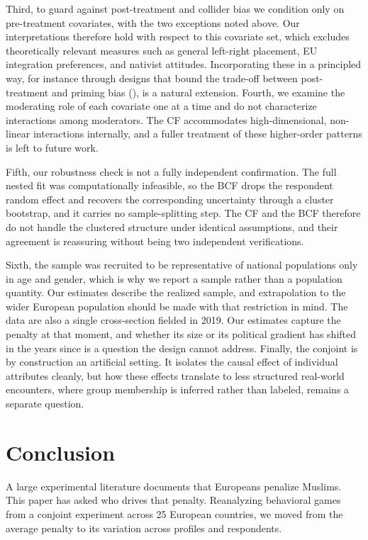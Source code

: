 \documentclass[
  10pt,
  a4paper,
  DIV=11,
  numbers=noendperiod]{scrartcl}
\begin{document}
Third, to guard against post-treatment and collider bias we condition
only on pre-treatment covariates, with the two exceptions noted above.
Our interpretations therefore hold with respect to this covariate set,
which excludes theoretically relevant measures such as general
left-right placement, EU integration preferences, and nativist
attitudes. Incorporating these in a principled way, for instance through
designs that bound the trade-off between post-treatment and priming bias
(), is a
natural extension. Fourth, we examine the moderating role of each
covariate one at a time and do not characterize interactions among
moderators. The CF accommodates high-dimensional, non-linear
interactions internally, and a fuller treatment of these higher-order
patterns is left to future work.

Fifth, our robustness check is not a fully independent confirmation. The
full nested fit was computationally infeasible, so the BCF drops the
respondent random effect and recovers the corresponding uncertainty
through a cluster bootstrap, and it carries no sample-splitting step.
The CF and the BCF therefore do not handle the clustered structure under
identical assumptions, and their agreement is reassuring without being
two independent verifications.

Sixth, the sample was recruited to be representative of national
populations only in age and gender, which is why we report a sample
rather than a population quantity. Our estimates describe the realized
sample, and extrapolation to the wider European population should be
made with that restriction in mind. The data are also a single
cross-section fielded in 2019. Our estimates capture the penalty at that
moment, and whether its size or its political gradient has shifted in
the years since is a question the design cannot address. Finally, the
conjoint is by construction an artificial setting. It isolates the
causal effect of individual attributes cleanly, but how these effects
translate to less structured real-world encounters, where group
membership is inferred rather than labeled, remains a separate question.

\section{Conclusion}\label{sec-conclusion}

A large experimental literature documents that Europeans penalize
Muslims. This paper has asked who drives that penalty. Reanalyzing
behavioral games from a conjoint experiment across 25 European
countries, we moved from the average penalty to its variation across
profiles and respondents.
\end{document}
